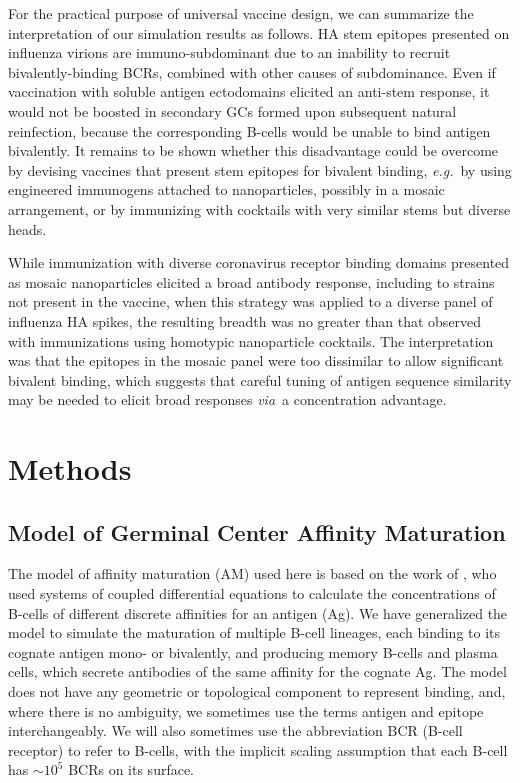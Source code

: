 \documentclass[utf8]{frontiersHLTH}%
\newcommand{\cred}[1]{\textsf{\color{red}#1}}
\def\eg {{\it e.g.}}
\def\via {{\it via}}
\begin{document}
\cred{For the practical purpose of universal vaccine
design, we can summarize the interpretation of our simulation results as
follows.  HA stem epitopes presented on influenza virions are
immuno-subdominant due to an inability to recruit bivalently-binding
BCRs, combined with other causes of subdominance. Even if vaccination with
soluble antigen ectodomains elicited an anti-stem response, it would not
be boosted in secondary GCs formed upon subsequent natural reinfection, 
because the corresponding B-cells would be unable to bind antigen
bivalently. It remains to be shown whether this disadvantage could be
overcome by devising vaccines that present stem epitopes for bivalent
binding, \eg~by using engineered immunogens attached to
nanoparticles,\cite{corbett19} possibly in a mosaic
arrangement\cite{cohen21}, or by immunizing with cocktails with very
similar stems but diverse heads\cite{glanville20}.}

\cred{While
immunization with diverse coronavirus receptor binding domains presented
as mosaic nanoparticles elicited a broad antibody response, including to
strains not present in the vaccine,\cite{cohen21} when this strategy was
applied to a diverse panel of influenza HA spikes, the resulting breadth
was no greater than that observed with immunizations using homotypic
nanoparticle cocktails.\cite{cohen21a} The interpretation was that the
epitopes in the mosaic panel were too dissimilar to allow significant
bivalent binding, which suggests that careful tuning of antigen sequence
similarity may be needed to elicit broad responses \via~a concentration
advantage.}

\section{Methods}
\label{sec:methods}

\subsection*{Model of Germinal Center Affinity Maturation}

The model of affinity maturation (AM) used here is based on the work of
\citet{kepler93},
who used systems of coupled
differential equations to calculate the concentrations of B-cells of
different discrete affinities for an antigen (Ag). %
We have generalized the model to
simulate the maturation of multiple B-cell lineages, each binding to its cognate
antigen mono- or bivalently, and producing memory B-cells and plasma
cells, which secrete antibodies of the same affinity for the cognate Ag. The model does not have any
geometric or topological component to represent binding, and, where there is no ambiguity, we sometimes use
the terms antigen and epitope interchangeably. We will also sometimes use
the abbreviation BCR (B-cell receptor) to refer to B-cells, with the implicit
scaling assumption that each B-cell has $\sim10^5$ BCRs on its surface.\cite{casten88,Alberts02}
\end{document}
